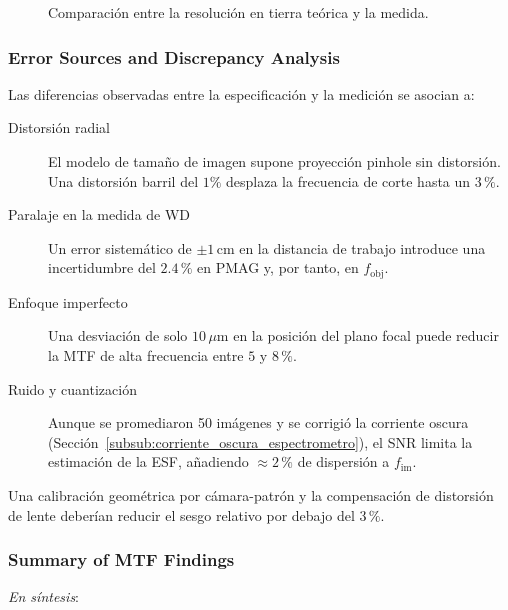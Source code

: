     \begin{figure}[H]
        \centering
        \caption{Comparación entre la resolución en tierra teórica y la medida.}
        \label{fig:grd_comp}
    \end{figure}

    \subsubsection{Error Sources and Discrepancy Analysis}
    \label{subsub:grd_errors}
    Las diferencias observadas entre la especificación y la medición se asocian a:

    \begin{description}
      \item[Distorsión radial]  
            El modelo de tamaño de imagen supone proyección pinhole sin distorsión.
            Una distorsión barril del \(1\%\) desplaza la frecuencia de corte
            hasta un \(3\,\%\).
      \item[Paralaje en la medida de WD]  
            Un error sistemático de \(\pm1\,\mathrm{cm}\) en la distancia
            de trabajo introduce una incertidumbre del \(2.4\,\%\) en PMAG
            y, por tanto, en \(f_{\text{obj}}\).
      \item[Enfoque imperfecto]  
            Una desviación de solo \(10\,\mu\mathrm{m}\) en la posición
            del plano focal puede reducir la MTF de alta frecuencia
            entre \(5\) y \(8\,\%\).
      \item[Ruido y cuantización]  
            Aunque se promediaron 50 imágenes y se corrigió la corriente
            oscura (Sección~\ref{subsub:corriente_oscura_espectrometro}),
            el SNR limita la estimación de la ESF, añadiendo
            \(\approx2\,\%\) de dispersión a \(f_{\text{im}}\).
    \end{description}

    Una calibración geométrica por cámara-patrón y la
    compensación de distorsión de lente deberían reducir el sesgo relativo
    por debajo del \(3\,\%\).

    \subsubsection{Summary of MTF Findings}
    \label{subsub:grd_summary}
    \emph{En síntesis}:

